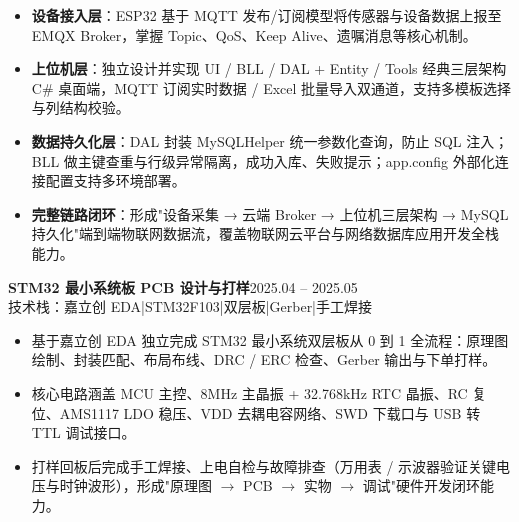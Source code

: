 \documentclass[10pt,a4paper]{article}
\newcommand{\projectblock}[3]{%
    {\bfseries\color{darktext}#1}\hfill{\color{graytext}#2}\\%
    {\small\color{graytext}#3}%
    \vspace{0.2em}%
}
\begin{document}
\begin{itemize}[leftmargin=1.5em, itemsep=2pt, parsep=0pt, topsep=2pt]
    \item \textbf{设备接入层}：ESP32 基于 MQTT 发布/订阅模型将传感器与设备数据上报至 EMQX Broker，掌握 Topic、QoS、Keep Alive、遗嘱消息等核心机制。
    \item \textbf{上位机层}：独立设计并实现 UI / BLL / DAL + Entity / Tools 经典三层架构 C\# 桌面端，MQTT 订阅实时数据 / Excel 批量导入双通道，支持多模板选择与列结构校验。
    \item \textbf{数据持久化层}：DAL 封装 MySQLHelper 统一参数化查询，防止 SQL 注入；BLL 做主键查重与行级异常隔离，成功入库、失败提示；app.config 外部化连接配置支持多环境部署。
    \item \textbf{完整链路闭环}：形成"设备采集 → 云端 Broker → 上位机三层架构 → MySQL 持久化"端到端物联网数据流，覆盖物联网云平台与网络数据库应用开发全栈能力。
\end{itemize}

\vspace{0.15em}

\projectblock{STM32 最小系统板 PCB 设计与打样}{2025.04 -- 2025.05}{技术栈：嘉立创 EDA\hspace{0.3em}|\hspace{0.3em}STM32F103\hspace{0.3em}|\hspace{0.3em}双层板\hspace{0.3em}|\hspace{0.3em}Gerber\hspace{0.3em}|\hspace{0.3em}手工焊接}

\begin{itemize}[leftmargin=1.5em, itemsep=2pt, parsep=0pt, topsep=2pt]
    \item 基于嘉立创 EDA 独立完成 STM32 最小系统双层板从 0 到 1 全流程：原理图绘制、封装匹配、布局布线、DRC / ERC 检查、Gerber 输出与下单打样。
    \item 核心电路涵盖 MCU 主控、8MHz 主晶振 + 32.768kHz RTC 晶振、RC 复位、AMS1117 LDO 稳压、VDD 去耦电容网络、SWD 下载口与 USB 转 TTL 调试接口。
    \item 打样回板后完成手工焊接、上电自检与故障排查（万用表 / 示波器验证关键电压与时钟波形），形成"原理图 $\to$ PCB $\to$ 实物 $\to$ 调试"硬件开发闭环能力。
\end{itemize}

\vspace{0.15em}
\end{document}
